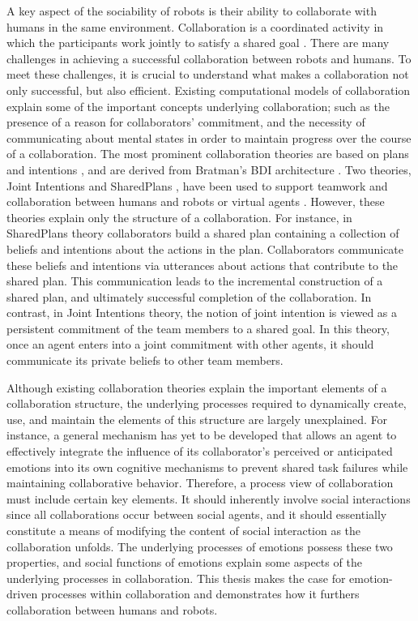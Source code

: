\documentclass[12pt]{report}
\begin{document}
A key aspect of the sociability of robots is their ability to collaborate with
humans in the same environment. Collaboration is a coordinated activity in which
the participants work jointly to satisfy a shared goal
\cite{grosz:plans-discourse}. There are many challenges in achieving a
successful collaboration between robots and humans. To meet these challenges, it
is crucial to understand what makes a collaboration not only successful, but
also efficient. Existing computational models of collaboration explain some of
the important concepts underlying collaboration; such as the presence of a
reason for collaborators' commitment, and the necessity of communicating about
mental states in order to maintain progress over the course of a collaboration.
The most prominent collaboration theories are based on plans and intentions
\cite{cohen:teamwork} \cite{grosz:plans-discourse}
\cite{Litman:discourse-commonsense}, and are derived from Bratman's BDI
architecture \cite{bratman:intentions-plans}. Two theories, Joint Intentions
\cite{cohen:teamwork} and SharedPlans
\cite{grosz:planning-acting,grosz:collaboration,grosz:plans-discourse}, have
been used to support teamwork and collaboration between humans and robots or
virtual agents \cite{breazeal:humanoid-robots}
\cite{montreuil:planning-robot-activity} \cite{sidner:enagagement-robot}
\cite{yen:cast}. However, these theories explain only the structure of a
collaboration. For instance, in SharedPlans theory collaborators build a shared
plan containing a collection of beliefs and intentions about the actions in the
plan. Collaborators communicate these beliefs and intentions via utterances
about actions that contribute to the shared plan. This communication leads to
the incremental construction of a shared plan, and ultimately successful
completion of the collaboration. In contrast, in Joint Intentions theory, the
notion of joint intention is viewed as a persistent commitment of the team
members to a shared goal. In this theory, once an agent enters into a joint
commitment with other agents, it should communicate its private beliefs to other
team members.

Although existing collaboration theories explain the important elements of a
collaboration structure, the underlying processes required to dynamically
create, use, and maintain the elements of this structure are largely
unexplained. For instance, a general mechanism has yet to be developed that
allows an agent to effectively integrate the influence of its collaborator's
perceived or anticipated emotions into its own cognitive mechanisms to prevent
shared task failures while maintaining collaborative behavior. Therefore, a
process view of collaboration must include certain key elements. It should
inherently involve social interactions since all collaborations occur between
social agents, and it should essentially constitute a means of modifying the
content of social interaction as the collaboration unfolds. The underlying
processes of emotions possess these two properties, and social functions of
emotions explain some aspects of the underlying processes in collaboration. This
thesis makes the case for emotion-driven processes within collaboration and
demonstrates how it furthers collaboration between humans and robots.
\end{document}
